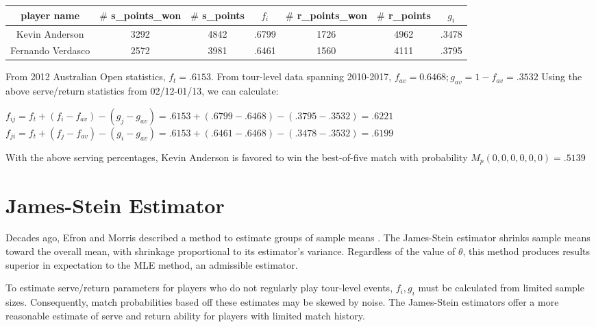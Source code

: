 \documentclass[chapterprefix=false]{report}
\begin{document}
\begin{center}
\begin{tabular}{ |c|c|c|c|c|c|c| } 
 \hline
 player name & $\#$ s\_points\_won & $\#$ s\_points
&$f_i$ & $\#$ r\_points\_won & $\#$ r\_points & $g_i$ \\ 
 \hline
 Kevin Anderson & 3292 & 4842 & .6799 & 1726 & 4962 & .3478\\ 
 \hline
 Fernando Verdasco & 2572 & 3981 & .6461 & 1560 & 4111 & .3795\\ 
 \hline
\end{tabular}
\end{center}

From 2012 Australian Open statistics, $f_t=.6153$. From tour-level data spanning 2010-2017, $f_{av} = 0.6468; g_{av} = 1-f_{av} =.3532$ Using the above serve/return statistics from 02/12-01/13, we can calculate:

\begin{center}
$f_{ij} = f_t + (f_i-f_{av})-(g_j-g_{av}) = .6153 + (.6799-.6468) - (.3795-.3532) = .6221$
$f_{ji} = f_t + (f_j-f_{av})-(g_i-g_{av}) = .6153 + (.6461-.6468) - (.3478-.3532) = .6199$
\end{center}

With the above serving percentages, Kevin Anderson is favored to win the best-of-five match with probability $M_p(0,0,0,0,0,0) = .5139$


\section{James-Stein Estimator}
Decades ago, Efron and Morris described a method to estimate groups of sample means \cite{EfronandMorris1977}. The James-Stein estimator shrinks sample means toward the overall mean, with shrinkage proportional to its estimator's variance. Regardless of the value of $\theta$, this method produces results superior in expectation to the MLE method, an admissible estimator.

To estimate serve/return parameters for players who do not regularly play tour-level events, $f_i,g_i$ must be calculated from limited sample sizes. Consequently, match probabilities based off these estimates may be skewed by noise. The James-Stein estimators offer a more reasonable estimate of serve and return ability for players with limited match history. 

\end{document}
